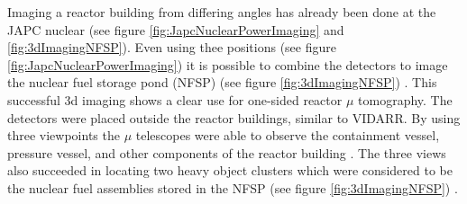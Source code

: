 Imaging a reactor building from differing angles has already been done at the JAPC nuclear (see figure \ref{fig:JapcNuclearPowerImaging} and \ref{fig:3dImagingNFSP}). Even using thee positions (see figure \ref{fig:JapcNuclearPowerImaging}) it is possible to combine the detectors to image the nuclear fuel storage pond (NFSP) (see figure \ref{fig:3dImagingNFSP}) \cite{Fujii_ReactorRadiography_2019}. This successful 3d imaging shows a clear use for one-sided reactor $\mu$ tomography. The detectors were placed outside the reactor buildings, similar to VIDARR. By using three viewpoints the $\mu$ telescopes were able to observe the containment vessel, pressure vessel, and other components of the reactor building \cite{Fujii_ReactorRadiography_2019}. The three views also succeeded in locating two heavy object clusters which were considered to be the nuclear fuel assemblies stored in the NFSP (see figure \ref{fig:3dImagingNFSP}) \cite{Fujii_ReactorRadiography_2019}.

